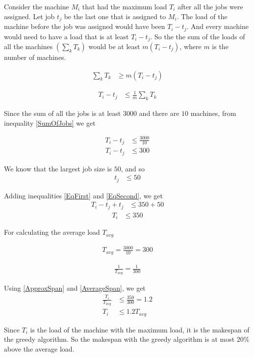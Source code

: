 \documentclass[paper=a4, fontsize=11pt]{scrartcl} %
\numberwithin{figure}{section} %
\numberwithin{table}{section} %
\begin{document}
\begin{enumerate}
Consider the machine $M_i$ that had the maximum load $T_i$ after all the jobs were assigned. Let job $t_j$ be the last one that is assigned to $M_i$. The load of the machine before the job was assigned would have been $T_i - t_j$. And every machine would need to have a load that is at least $T_i - t_j$. So the the sum of the loads of all the machines $(\sum_k T_k)$ would be at least $m (T_i - t_j)$, where $m$ is the number of machines.

\begin{align*} 
\sum_k T_k &\geq m (T_i - t_j)
\end{align*}

\begin{align} \label{SumOfJobs}
T_i - t_j &\leq \frac{1}{m} \sum_k T_k
\end{align}

Since the sum of all the jobs is at least $3000$ and there are $10$ machines, from inequality \ref{SumOfJobs} we get

\begin{align*} 
T_i - t_j &\leq \frac{3000}{10} 
\end{align*}
\begin{align} \label{EqFirst}
T_i - t_j &\leq 300
\end{align}

We know that the largest job size is $50$, and so
\begin{align} \label{EqSecond}
t_j &\leq 50
\end{align}

Adding inequalities \ref{EqFirst} and \ref{EqSecond}, we get
\begin{align*} 
T_i - t_j + t_j &\leq 350 + 50
\end{align*}
\begin{align} \label{ApproxSpan}
T_i &\leq 350
\end{align}

For calculating the average load $T_{avg}$

\begin{align*} 
T_{avg} = \frac{3000}{10} = 300
\end{align*}

\begin{align} \label{AverageSpan}
\frac{1}{T_{avg}} = \frac{1}{300}
\end{align}

Using  \ref{ApproxSpan} and \ref{AverageSpan}, we get
\begin{align*} 
\frac{T_i}{T_{avg}} &\leq \frac{350}{300} = 1.2\\
T_i &\leq 1.2 T_{avg}
\end{align*}

Since $T_i$ is the load of the machine with the maximum load, it is the makespan of the greedy algorithm. So the makespan with the greedy algorithm is at most 20\% above the average load.

\end{enumerate}

\end{document}
